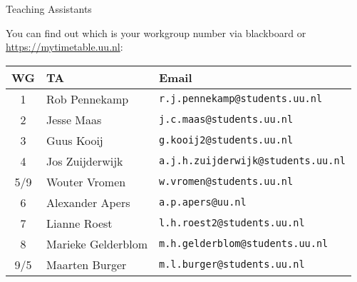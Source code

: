 \begin{frame}{Teaching Assistants}

You can find out which is your workgroup number via blackboard or \url{https://mytimetable.uu.nl}:
{\small \begin{center}
\begin{tabular}{| c | l | l |}
\hline
\textbf{WG} & \textbf{TA} & \textbf{Email}\\\hline
 1& Rob Pennekamp& \texttt{r.j.pennekamp@students.uu.nl}\\
 2& Jesse Maas& \texttt{j.c.maas@students.uu.nl}\\
 3& Guus Kooij& \texttt{g.kooij2@students.uu.nl}\\
 4& Jos Zuijderwijk& \texttt{a.j.h.zuijderwijk@students.uu.nl}\\
 5/9& Wouter Vromen& \texttt{w.vromen@students.uu.nl}\\
 6& Alexander Apers& \texttt{a.p.apers@uu.nl}\\
 7&Lianne Roest& \texttt{l.h.roest2@students.uu.nl}\\
 8& Marieke Gelderblom& \texttt{m.h.gelderblom@students.uu.nl}\\
 9/5& Maarten Burger& \texttt{m.l.burger@students.uu.nl}\\\hline
\end{tabular}
\end{center}}


\end{frame}

